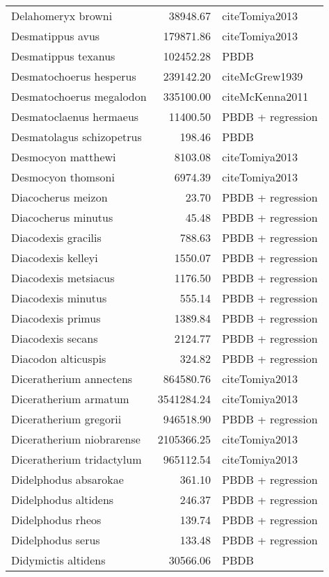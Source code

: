\begin{table}[ht]
\begin{tabular}{lrl}
  Delahomeryx browni & 38948.67 & cite{Tomiya2013} \\ 
  Desmatippus avus & 179871.86 & cite{Tomiya2013} \\ 
  Desmatippus texanus & 102452.28 & PBDB \\ 
  Desmatochoerus hesperus & 239142.20 & cite{McGrew1939} \\ 
  Desmatochoerus megalodon & 335100.00 & cite{McKenna2011} \\ 
  Desmatoclaenus hermaeus & 11400.50 & PBDB + regression \\ 
  Desmatolagus schizopetrus & 198.46 & PBDB \\ 
  Desmocyon matthewi & 8103.08 & cite{Tomiya2013} \\ 
  Desmocyon thomsoni & 6974.39 & cite{Tomiya2013} \\ 
  Diacocherus meizon & 23.70 & PBDB + regression \\ 
  Diacocherus minutus & 45.48 & PBDB + regression \\ 
  Diacodexis gracilis & 788.63 & PBDB + regression \\ 
  Diacodexis kelleyi & 1550.07 & PBDB + regression \\ 
  Diacodexis metsiacus & 1176.50 & PBDB + regression \\ 
  Diacodexis minutus & 555.14 & PBDB + regression \\ 
  Diacodexis primus & 1389.84 & PBDB + regression \\ 
  Diacodexis secans & 2124.77 & PBDB + regression \\ 
  Diacodon alticuspis & 324.82 & PBDB + regression \\ 
  Diceratherium annectens & 864580.76 & cite{Tomiya2013} \\ 
  Diceratherium armatum & 3541284.24 & cite{Tomiya2013} \\ 
  Diceratherium gregorii & 946518.90 & PBDB + regression \\ 
  Diceratherium niobrarense & 2105366.25 & cite{Tomiya2013} \\ 
  Diceratherium tridactylum & 965112.54 & cite{Tomiya2013} \\ 
  Didelphodus absarokae & 361.10 & PBDB + regression \\ 
  Didelphodus altidens & 246.37 & PBDB + regression \\ 
  Didelphodus rheos & 139.74 & PBDB + regression \\ 
  Didelphodus serus & 133.48 & PBDB + regression \\ 
  Didymictis altidens & 30566.06 & PBDB \\ 

\end{tabular}
\end{table}
